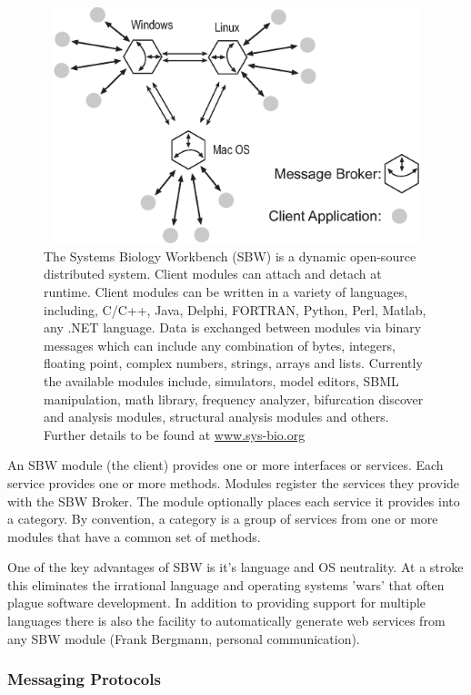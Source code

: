 \documentclass[12pt]{article}
\begin{document}
{\begin{figure}[h] \label{Figure:SBwFig}
\begin{center}
  \includegraphics[width=4.6in,height=2.7in]{sbwFig.eps}
\end{center}
\caption{The Systems Biology Workbench (SBW) is a dynamic open-source
distributed system. Client modules can attach and detach at runtime.
Client modules can be written in a variety of languages,
including, C/C++, Java, Delphi, FORTRAN, Python, Perl, Matlab, any .NET language.
Data is exchanged between modules via binary messages which can include any combination
of bytes, integers, floating point, complex numbers, strings, arrays and lists. Currently the available modules include, simulators, model editors, SBML manipulation, math library, frequency analyzer, bifurcation discover and analysis modules, structural analysis modules and others. Further details to be found at \url{www.sys-bio.org}}
\end{figure}

An SBW module (the client) provides one or more interfaces or services. Each
service provides one or more methods. Modules register the
services they provide with the SBW Broker. The module optionally
places each service it provides into a category. By convention, a
category is a group of services from one or more modules that have
a common set of methods.

One of the key advantages of SBW is it's language and OS
neutrality. At a stroke this eliminates the irrational language and operating
systems 'wars' that often plague software development. In addition
to providing support for multiple languages there is also the facility to
automatically generate web services from any SBW module (Frank Bergmann, personal communication).

\subsubsection*{Messaging Protocols}

}
\end{document}
